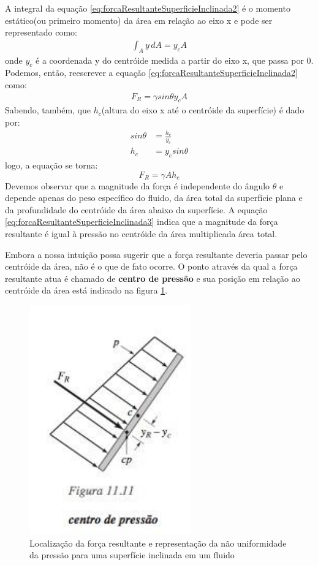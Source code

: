 \documentclass{article}
\begin{document}
A integral da equação \ref{eq:forcaResultanteSuperficieInclinada2} é o momento estático(ou primeiro momento) da área em relação ao eixo x e pode ser representado como:
\begin{align}
  \int_{A}^{ } y\, dA = y_cA
\end{align}
onde $y_c$ é a coordenada y do centróide medida a partir do eixo x, que passa por 0.
Podemos, então, reescrever a equação \ref{eq:forcaResultanteSuperficieInclinada2} como:
\begin{align*}
   F_R=\gamma sin\theta y_c A
\end{align*}
Sabendo, também, que $h_c$(altura do eixo x até o centróide da superfície) é dado por:
\begin{align*}
  sin\theta &=\frac{h_c}{y_c} \\
  h_c&=y_c sin\theta 
\end{align*}
logo, a equação se torna:
\begin{equation}
  F_R=\gamma A h_c
  \label{eq:forcaResultanteSuperficieInclinada3}
\end{equation}
Devemos observar que a magnitude da força é independente do ângulo $\theta$ e depende apenas do peso específico do fluido, da área total da superfície plana e da profundidade do centróide da área abaixo da superfície. A equação \ref{eq:forcaResultanteSuperficieInclinada3} indica que a magnitude da força resultante é igual à pressão no centróide da área multiplicada área total.

Embora a nossa intuição possa sugerir que a força resultante deveria passar pelo centróide da área, não é o que de fato ocorre. O ponto através da qual a força resultante atua é chamado de \textbf{centro de pressão} e sua posição em relação ao centróide da área está indicado na figura \ref{fig:centroDePressoaInclinado}.

\begin{figure}[!h]
  \centering
  \includegraphics[width=0.3\linewidth]{centroDePressoaInclinado.png}
  \caption{Localização da força resultante e representação da não uniformidade da pressão para uma superfície inclinada em um fluido}
  \label{fig:centroDePressoaInclinado}
\end{figure}
\end{document}
